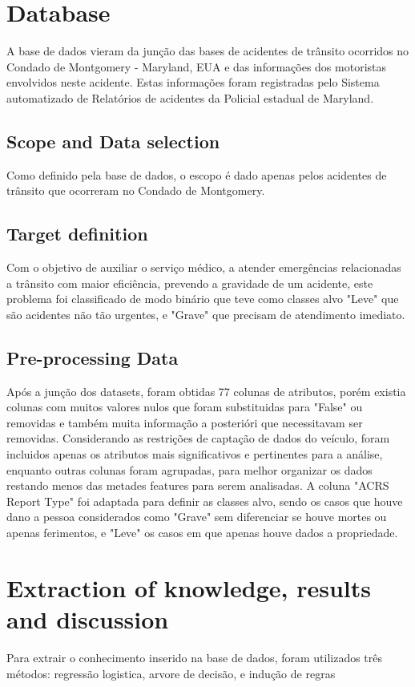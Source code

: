 \documentclass[conference]{IEEEtran}
\begin{document}
\section{Database}

A base de dados vieram da junção das bases de acidentes de trânsito\cite{incidents}
ocorridos no Condado de Montgomery - Maryland, EUA e das informações dos motoristas envolvidos neste acidente\cite{drivers}.
Estas informações foram registradas pelo Sistema automatizado de Relatórios de acidentes da Policial estadual de Maryland.  

\subsection{Scope and Data selection}
Como definido pela base de dados, o escopo é dado apenas pelos acidentes de trânsito que ocorreram no Condado de Montgomery. 
\subsection{Target definition}
Com o objetivo de auxiliar o serviço médico, a atender emergências relacionadas a trânsito com maior eficiência,
prevendo a gravidade de um acidente, este problema foi classificado de modo binário que teve como classes alvo 
"Leve" que são acidentes não tão urgentes, e "Grave" que precisam de atendimento imediato. 

\subsection{Pre-processing Data}
Após a junção dos datasets, foram obtidas 77 colunas de atributos, porém existia colunas com muitos valores nulos que foram 
substituidas para "False" ou removidas e também muita  informação a posterióri que necessitavam ser removidas.
Considerando as restrições de captação de dados do veículo, foram incluidos apenas os atributos mais significativos e pertinentes para a análise, 
enquanto outras colunas foram agrupadas, para melhor organizar os dados restando menos das metades features para serem analisadas.
A coluna "ACRS Report Type" foi adaptada para definir as classes alvo, sendo os casos que houve dano a pessoa  considerados como 
"Grave" sem diferenciar se houve mortes ou apenas ferimentos, e "Leve" os casos em que apenas houve dados a propriedade.

\section{Extraction of knowledge, results and discussion}
Para extrair o conhecimento inserido na base de dados, 
foram utilizados três métodos: regressão logistica, arvore de decisão, e indução de regras
\end{document}
